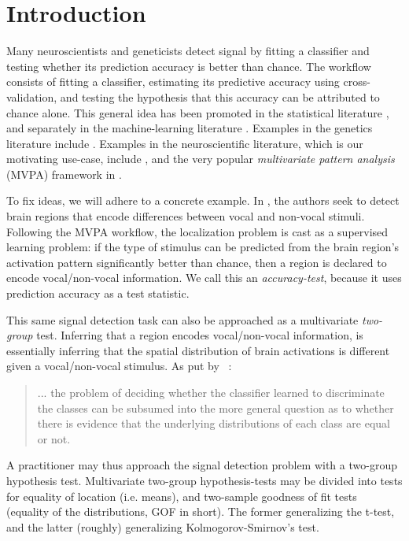 \documentclass[oupdraft]{bio}
\begin{document}
\section{Introduction}
\label{sec:introduction}

Many neuroscientists and geneticists detect signal by fitting a classifier and testing whether its prediction accuracy is better than chance. 
The workflow consists of fitting a classifier, estimating its predictive accuracy using cross-validation, and testing the hypothesis that this accuracy can be attributed to chance alone. 
This general idea has been promoted in the statistical literature \citep{friedman2003multivariate}, and separately in the machine-learning literature \citep{eric2008testing,ojala_permutation_2010,lopez2016revisiting}.
Examples in the genetics literature include \cite{golub_molecular_1999,slonim_class_2000,
juan_prediction_2004,jiang_calculating_2008,yu2007two}.
Examples in the neuroscientific literature, which is our motivating use-case, include \cite{golland_permutation_2003,pereira_machine_2009,
varoquaux_assessing_2016}, and the very popular \emph{multivariate pattern analysis} (MVPA) framework in \cite{kriegeskorte_information-based_2006}.

To fix ideas, we will adhere to a concrete example.
In \cite{gilron_quantifying_2016}, the authors seek to detect brain regions that encode differences between vocal and non-vocal stimuli. 
Following the MVPA workflow, the localization problem is cast as a supervised learning problem: if the type of stimulus can be predicted from the brain region's activation pattern significantly better than chance, then a region is declared to encode vocal/non-vocal information. 
We call this an \emph{accuracy-test}, because it uses prediction accuracy as a test statistic. 

This same signal detection task can also be approached as a multivariate \emph{two-group} test.
Inferring that a region encodes vocal/non-vocal information, is essentially inferring that the spatial distribution of brain activations is different given a vocal/non-vocal stimulus. 
As put by ~\cite{pereira_machine_2009}: 
\begin{quote}
	... the problem of deciding whether the classifier learned to discriminate the classes can be subsumed into the more general question as to whether there is evidence that the underlying distributions of each class are equal or not.
\end{quote}
A practitioner may thus approach the signal detection problem with a two-group hypothesis test.
Multivariate two-group hypothesis-tests may be divided into tests for equality of location (i.e. means), and two-sample goodness of fit tests (equality of the distributions, GOF in short).
The former generalizing the t-test, and the latter (roughly) generalizing Kolmogorov-Smirnov's test.
\end{document}
